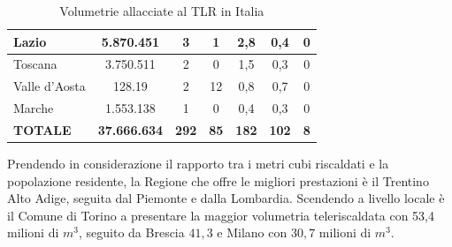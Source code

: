 \documentclass[laurea,oneside,11pt]{USiena_tesiLM}
\begin{document}
\begin{table}[!ht]
{\begin{tabular}{|l|c|c|c|c|c|c|}
Lazio                             & 5.870.451                                           & 3                                & 1                                     & 2,8                                        & 0,4                                     & 0                                         \\ \hline
Toscana                           & 3.750.511                                           & 2                                & 0                                     & 1,5                                        & 0,3                                     & 0                                         \\ \hline
Valle d'Aosta                     & 128.19                                              & 2                                & 12                                    & 0,8                                        & 0,7                                     & 0                                         \\ \hline
Marche                            & 1.553.138                                           & 1                                & 0                                     & 0,4                                        & 0,3                                     & 0                                         \\ \hline
\textbf{TOTALE}                   & \textbf{37.666.634}                                 & \textbf{292}                     & \textbf{85}                           & \textbf{182}                               & \textbf{102}                            & \textbf{8}                                \\ \hline
\end{tabular}}
\caption{Volumetrie allacciate al TLR in Italia}
\label{tab:volumetrie_teleriscaldamento}
\end{table}

Prendendo in considerazione il rapporto tra i metri cubi riscaldati e la popolazione
residente, la Regione che offre le migliori prestazioni è il Trentino Alto Adige, seguita dal Piemonte e dalla Lombardia. 
Scendendo a livello locale è il Comune di Torino a presentare la maggior volumetria teleriscaldata con 53,4 milioni di $m^3$, seguito da Brescia $41,3$ e Milano con $30,7$ milioni di $m^3$.\\
\end{document}

